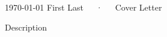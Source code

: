 \documentclass[11pt, a4paper]{awesome-cv}
\begin{document}
\makecvheader[R]

\makecvfooter
  {\today}
  {First Last~~~·~~~Cover Letter}
  {}

\makelettertitle

\begin{cvletter}

Description

\end{cvletter}


\makeletterclosing
\end{document}

